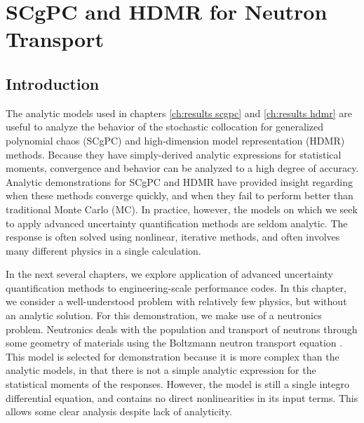
\chapter{SCgPC and HDMR for Neutron Transport} %

\label{ch:c5g7} %



\section{Introduction}
The analytic models used in chapters \ref{ch:results scgpc} and \ref{ch:results hdmr} are useful to
analyze the behavior of the stochastic collocation for generalized polynomial chaos (SCgPC) and high-dimension model
representation (HDMR)  methods.  Because they have simply-derived analytic expressions for statistical moments, convergence
and behavior can be analyzed to a high degree of accuracy.  Analytic demonstrations for SCgPC and HDMR have
provided insight regarding when these methods converge quickly, and when they fail to perform better than
traditional Monte Carlo (MC). In practice, however, the models on which we seek to apply
advanced uncertainty quantification methods are seldom analytic.  The response is often solved using nonlinear,
iterative methods, and often involves many different physics in a single calculation.

In the next several chapters, we explore application of advanced uncertainty quantification methods to
engineering-scale performance codes.  In this chapter, we consider a well-understood problem with
relatively few physics, but without an analytic solution.  For this demonstration, we make use of a neutronics
problem.  Neutronics deals with the population and transport of neutrons through some geometry of materials
using the Boltzmann neutron transport equation \cite{lewistrans}. This model is selected for demonstration
because it is more complex than the analytic models, in that there is not a simple analytic expression for the
statistical moments of the responses.  However, the model is still a single integro differential equation, and
contains no direct nonlinearities in its input terms.  This allows some clear analysis despite lack of
analyticity.

